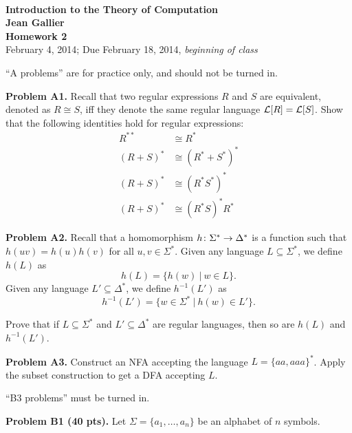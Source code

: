 \documentclass[12pt]{article}
\begin{document}
\begin{center}
\\
\vspace{1cm}
{\Large\bf Introduction to the Theory of Computation\\
Jean Gallier \\
\vspace{0.5cm}
Homework 2}\\[10pt]
February 4,  2014; Due February 18, 2014, {\it beginning of class}\\
\end{center}


``A problems'' are for practice only, and should not
be turned in.

\medskip\noindent
{\bf Problem A1.} 
Recall that two regular expressions $R$ and $S$ are equivalent, denoted
as $R \cong S$, iff they denote the same regular language 
${\cal L}[R] = {\cal L}[S]$.
Show that the following identities hold for regular expressions:
\begin{align*}
R^{**} &\cong  R^{*}\\
(R + S)^{*} &\cong  (R^{*} + S^{*})^{*}\\
(R + S)^{*} &\cong  (R^{*}S^{*})^{*}\\
(R + S)^{*} &\cong  (R^{*}S)^{*}R^{*}
\end{align*}


\vspace {0.25cm}\noindent
{\bf Problem A2.} 
Recall that a homomorphism $h\colon \Sigma^*\rightarrow \Delta^*$
is a function such that $h(uv) = h(u)h(v)$
for all $u, v\in\Sigma^*$.
Given any language $L\subseteq \Sigma^*$, we define $h(L)$ as
$$h(L) = \{h(w)\ |\ w\in L\}.$$
Given any language $L'\subseteq \Delta^*$, we define $h^{-1}(L')$ as
$$h^{-1}(L') = \{w\in \Sigma^*\ | \ h(w) \in L'\}.$$

\medskip
Prove that if  $L\subseteq \Sigma^*$ and
$L'\subseteq \Delta^*$ are regular languages, then
so are $h(L)$ and $h^{-1}(L')$.


\medskip\noindent
{\bf Problem A3.} 
Construct an NFA accepting the language
$L = \{aa, aaa\}^*$. Apply the subset construction
to get a DFA accepting $L$.

\vspace {0.25cm}
``B3  problems'' must be turned in.


\vspace{0.25cm}\noindent
{\bf Problem B1 (40 pts).}  
Let $\Sigma = \{a_1,\ldots, a_n\}$ 
be an alphabet of $n$ symbols.
\end{document}
